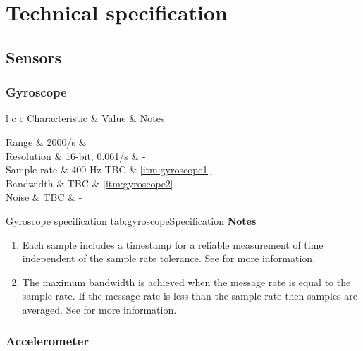 \section{Technical specification}

\subsection{Sensors}

\newcommand{\sensorTable}[4]{
    \customTable
    {l c c}
    {Characteristic & Value & Notes}
    {
        #1
    }
    {#2}
    {#3}
    \textbf{Notes}
    \begin{enumerate}[nolistsep]
        #4
    \end{enumerate}
}

\newcommand{\noteSampleRate}{Each sample includes a timestamp for a reliable measurement of time independent of the sample rate tolerance.  See \Fref{sec:messageRates} for more information.}

\newcommand{\noteBandwidth}{The maximum bandwidth is achieved when the message rate is equal to the sample rate.  If the message rate is less than the sample rate then samples are averaged.  See \Fref{sec:messageRates} for more information.}

\newcommand{\noteAccuracy}[3]{The accuracy at 1 #1 is evaluated as the deviation of the measured magnitude of #2 for a 360\textdegree{} rotation around the X, Y, and Z axis aligned to the #3 axis.}

\subsubsection{Gyroscope}

\sensorTable
{
    Range & \textpm{}2000\textdegree{}/s & \\
    Resolution & 16-bit, 0.061\textdegree{}/s & -\\
    Sample rate & 400 Hz \textpm{}TBC & \ref{itm:gyroscope1}\\
    Bandwidth & TBC & \ref{itm:gyroscope2}\\
    Noise & TBC & -\\
}
{Gyroscope specification}
{tab:gyroscopeSpecification}
{
    \item \label{itm:gyroscope1} \noteSampleRate
    \item \label{itm:gyroscope2} \noteBandwidth
}

\subsubsection{Accelerometer}

